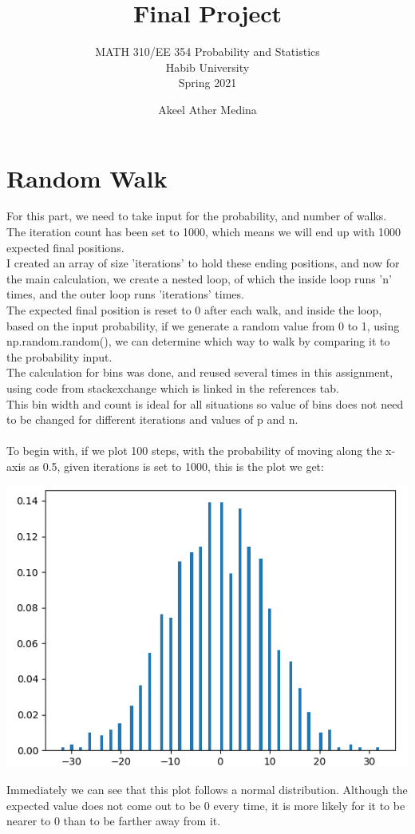\documentclass[addpoints]{exam}
\title{Final Project}
\author{MATH 310/EE 354 Probability and Statistics\\Habib University\\Spring 2021}
\date{Akeel Ather Medina}
\begin{document}
\maketitle


\section{Random Walk}
\begin{questions}
\question
For this part, we need to take input for the probability, and number of walks. The iteration count has been set to 1000, which means we will end up with 1000 expected final positions.\\
I created an array of size 'iterations' to hold these ending positions, and now for the main calculation, we create a nested loop, of which the inside loop runs 'n' times, and the outer loop runs 'iterations' times. \\
The expected final position is reset to 0 after each walk, and inside the loop, based on the input probability, if we generate a random value from 0 to 1, using np.random.random(), we can determine which way to walk by comparing it to the probability input. \\
The calculation for bins was done, and reused several times in this assignment, using code from stackexchange which is linked in the references tab.\\
This bin width and count is ideal for all situations so value of bins does not need to be changed for different iterations and values of p and n.\\
\\
To begin with, if we plot 100 steps, with the probability of moving along the x-axis as 0.5, given iterations is set to 1000, this is the plot we get:\\
\begin{center}
\includegraphics[width=.48\textwidth]{images/p1_1_1.png}
\end{center}
Immediately we can see that this plot follows a normal distribution. Although the expected value does not come out to be 0 every time, it is more likely for it to be nearer to 0 than to be farther away from it. \\

\end{questions}
\end{document}
